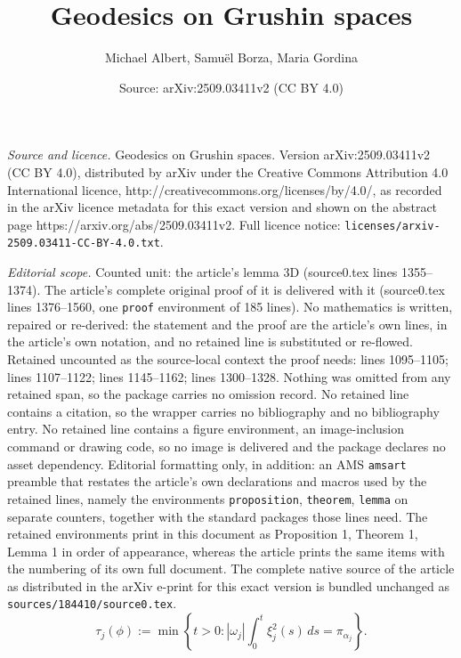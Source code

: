 \documentclass[10pt,a4paper]{amsart}
\title{Geodesics on Grushin spaces}
\author{Michael Albert, Samu\"el Borza, Maria Gordina}
\date{Source: arXiv:2509.03411v2 (CC BY 4.0)}
\begin{document}
\maketitle

\noindent\emph{Source and licence.} Geodesics on Grushin spaces. Version arXiv:2509.03411v2 (CC BY 4.0), distributed by arXiv under the Creative Commons Attribution 4.0 International licence, http://creativecommons.org/licenses/by/4.0/, as recorded in the arXiv licence metadata for this exact version and shown on the abstract page https://arxiv.org/abs/2509.03411v2. Full licence notice: \texttt{licenses/arxiv-2509.03411-CC-BY-4.0.txt}.\par\smallskip

\noindent\textit{Editorial scope.} Counted unit: the article's lemma 3D (source0.tex lines 1355--1374). The article's complete original proof of it is delivered with it (source0.tex lines 1376--1560, one \texttt{proof} environment of 185 lines). No mathematics is written, repaired or re-derived: the statement and the proof are the article's own lines, in the article's own notation, and no retained line is substituted or re-flowed.  Retained uncounted as the source-local context the proof needs: lines 1095--1105; lines 1107--1122; lines 1145--1162; lines 1300--1328.  Nothing was omitted from any retained span, so the package carries no omission record.  No retained line contains a citation, so the wrapper carries no bibliography and no bibliography entry.  No retained line contains a figure environment, an image-inclusion command or drawing code, so no image is delivered and the package declares no asset dependency.  Editorial formatting only, in addition: an AMS \texttt{amsart} preamble that restates the article's own declarations and macros used by the retained lines, namely the environments \texttt{proposition}, \texttt{theorem}, \texttt{lemma} on separate counters, together with the standard packages those lines need.  The retained environments print in this document as Proposition 1, Theorem 1, Lemma 1 in order of appearance, whereas the article prints the same items with the numbering of its own full document.  The complete native source of the article as distributed in the arXiv e-print for this exact version is bundled unchanged as \texttt{sources/184410/source0.tex}.
\begin{equation}\label{Conjectured Cut}
    \tau_j(\phi)
    :=
    \min
    \left\{
    t>0:
    |\omega_j|\int_0^t\xi_j^2(s)\,ds
    =
    \pi_{\alpha_j}
    \right\}.
\end{equation}
\end{document}
